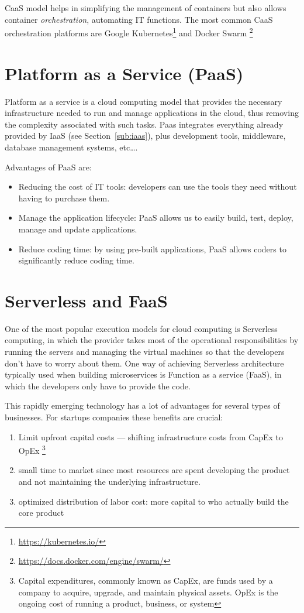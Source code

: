 CaaS model helps in simplifying the management of containers but also allows container \textit{orchestration}, automating IT 
functions. The most common CaaS orchestration platforms are Google Kubernetes\footnote{\url{https://kubernetes.io/}}
 and Docker Swarm \footnote{\url{https://docs.docker.com/engine/swarm/}}

\section{Platform as a Service (PaaS)}
\label{sec:paas}
Platform as a service is a cloud computing model that provides the necessary
infrastructure needed to run and manage applications in the cloud, thus removing the complexity 
associated with such tasks. Paas integrates everything already provided by IaaS (see Section~\ref{sub:iaas}), plus
development tools, middleware, database management systems, etc\dots. 

Advantages of PaaS are:
\begin{itemize}
  \item Reducing the cost of IT tools: developers can use the tools they need without having to purchase them.
  \item Manage the application lifecycle: PaaS allows us to easily build, test, deploy, manage and update applications.
  \item Reduce coding time: by using pre-built applications, PaaS allows coders to significantly reduce coding time.
\end{itemize}


\section{Serverless and FaaS}
\label{sec:faas}
One of the most popular execution models for cloud computing is Serverless computing, in which
the provider takes most of the operational responsibilities by running the servers and managing
the virtual machines so that the developers don't have to worry about them.
One way of achieving Serverless architecture typically used when building microservices is Function
as a service (FaaS), in which the developers only have to provide the code.

This rapidly emerging technology has a lot of advantages for several types of businesses.
For startups companies these benefits are crucial:
\begin{enumerate}
  \item Limit upfront capital costs --- shifting infrastructure costs from 
  CapEx to OpEx 
  \footnote{Capital expenditures, commonly known as CapEx, are funds used by a company to acquire, 
  upgrade, and maintain physical assets. OpEx is the ongoing cost of running a product, business, or system}
  \item small time to market since most resources are spent developing the product 
  and not maintaining the underlying infrastructure.
  \item optimized distribution of labor cost: more capital to who actually build the core product
\end{enumerate}
 



